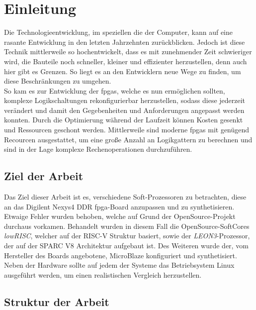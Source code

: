 \chapter{Einleitung}\label{ch:einleitung}

Die Technologieentwicklung, im speziellen die der Computer, kann auf eine rasante Entwicklung in den letzten
Jahrzehnten zurückblicken. Jedoch ist diese Technik mittlerweile so hochentwickelt, dass es mit zunehmender Zeit
schwieriger wird, die Bauteile noch schneller, kleiner und effizienter herzustellen, denn auch hier gibt es Grenzen.
So liegt es an den Entwicklern neue Wege zu finden, um diese Beschränkungen zu umgehen. \\
So kam es zur Entwicklung der \acp{fpga}, welche es nun ermöglichen sollten, komplexe Logikschaltungen
rekonfigurierbar herzustellen, sodass diese jederzeit verändert und damit den Gegebenheiten und
Anforderungen angepasst werden konnten. Durch die Optimierung während der Laufzeit können Kosten gesenkt und
Ressourcen geschont werden. Mittlerweile sind moderne \acp{fpga} mit genügend Recourcen ausgestattet, um eine
große Anzahl an Logikgattern zu berechnen und sind in der Lage komplexe Rechenoperationen durchzuführen.\\

\section{Ziel der Arbeit}\label{kap:zielderarbeit}

Das Ziel dieser Arbeit ist es, verschiedene Soft-Prozessoren zu betrachten, diese an das Digilent Nexys4 DDR \ac{fpga}-Board anzupassen und zu synthetisieren. Etwaige Fehler wurden behoben,
welche auf Grund der OpenSource-Projekt durchaus vorkamen. Behandelt wurden in diesem Fall die OpenSource-SoftCores \emph{lowRISC}, welcher auf der RISC-V Struktur basiert,
 sowie der \emph{LEON3}-Prozessor,
der auf der SPARC V8 Architektur aufgebaut ist. Des Weiteren wurde der, vom Hersteller des Boards angebotene, MicroBlaze konfiguriert und synthetisiert.\\
Neben der Hardware sollte auf jedem der Systeme das Betriebsystem Linux ausgeführt werden, um einen realistischen Vergleich herzustellen.


 \section{Struktur der Arbeit}\label{kap:strukturderarbeit}

